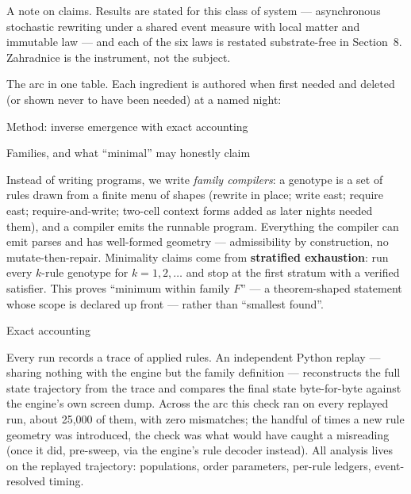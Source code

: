 A note on claims. Results are stated for this class of system ---
asynchronous stochastic rewriting under a shared event measure with
local matter and immutable law --- and each of the six laws is
restated substrate-free in Section~8. Zahradnice is the instrument,
not the subject.

\medskip
\noindent The arc in one table. Each ingredient is authored when
first needed and deleted (or shown never to have been needed) at a
named night:

\medskip
\noindent{}
\medskip

\sec Method: inverse emergence with exact accounting

\secc Families, and what “minimal” may honestly claim

Instead of writing programs, we write {\it family compilers}: a
genotype is a set of rules drawn from a finite menu of shapes
(rewrite in place; write east; require east; require-and-write;
two-cell context forms added as later nights needed them), and a
compiler emits the runnable program. Everything the compiler can
emit parses and has well-formed geometry --- admissibility by
construction, no mutate-then-repair. Minimality claims come from
{\bf stratified exhaustion}: run every $k$-rule genotype for
$k=1,2,\ldots$ and stop at the first stratum with a verified
satisfier. This proves “minimum within family $F$” --- a
theorem-shaped statement whose scope is declared up front --- rather
than “smallest found”.

\secc Exact accounting

Every run records a trace of applied rules. An independent Python
replay --- sharing nothing with the engine but the family
definition --- reconstructs the full state trajectory from the trace
and compares the final state byte-for-byte against the engine's own
screen dump. Across the arc this check ran on every replayed run,
about 25{,}000 of them, with zero mismatches; the handful of times a
new rule geometry was introduced, the check was what would have
caught a misreading (once it did, pre-sweep, via the engine's rule
decoder instead). All analysis lives on the replayed trajectory:
populations, order parameters, per-rule ledgers, event-resolved
timing.

